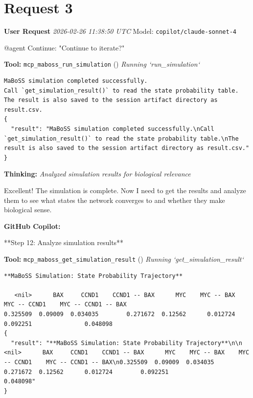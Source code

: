 \documentclass[11pt,a4paper]{article}
\begin{document}
\section{Request 3}
\begin{userbox}
\textbf{User Request}
\quad \textit{2026-02-26 11:38:50 UTC}
\quad Model: \texttt{copilot/claude-sonnet-4}

@agent Continue: "Continue to iterate?"

\end{userbox}
\begin{toolokbox}
\textbf{Tool:} \texttt{mcp\_maboss\_run\_simulation} (\checkmark)
\textit{Running `run\_simulation`}
\begin{lstlisting}
MaBoSS simulation completed successfully.
Call `get_simulation_result()` to read the state probability table.
The result is also saved to the session artifact directory as result.csv.
{
  "result": "MaBoSS simulation completed successfully.\nCall `get_simulation_result()` to read the state probability table.\nThe result is also saved to the session artifact directory as result.csv."
}
\end{lstlisting}
\end{toolokbox}
\begin{thinkbox}
\textbf{Thinking:} \textit{Analyzed simulation results for biological relevance}

Excellent! The simulation is complete. Now I need to get the results and analyze them to see what states the network converges to and whether they make biological sense.

\end{thinkbox}
\begin{copilotbox}
\textbf{GitHub Copilot:}

**Step 12: Analyze simulation results**

\end{copilotbox}
\begin{toolokbox}
\textbf{Tool:} \texttt{mcp\_maboss\_get\_simulation\_result} (\checkmark)
\textit{Running `get\_simulation\_result`}
\begin{lstlisting}
**MaBoSS Simulation: State Probability Trajectory**

   <nil>      BAX     CCND1    CCND1 -- BAX      MYC    MYC -- BAX    MYC -- CCND1    MYC -- CCND1 -- BAX
0.325509  0.09009  0.034035        0.271672  0.12562      0.012724        0.092251               0.048098
{
  "result": "**MaBoSS Simulation: State Probability Trajectory**\n\n   <nil>      BAX     CCND1    CCND1 -- BAX      MYC    MYC -- BAX    MYC -- CCND1    MYC -- CCND1 -- BAX\n0.325509  0.09009  0.034035        0.271672  0.12562      0.012724        0.092251               0.048098"
}
\end{lstlisting}
\end{toolokbox}
\end{document}
